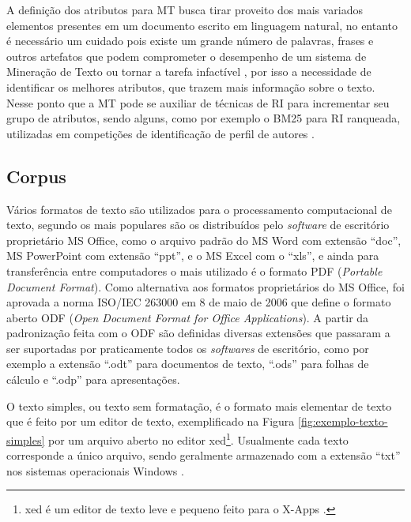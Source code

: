     A definição dos atributos para MT busca tirar proveito dos mais variados elementos presentes em um documento escrito em linguagem natural, no entanto é necessário um cuidado pois existe um grande número de palavras, frases e outros artefatos que podem comprometer o desempenho de um sistema de Mineração de Texto ou tornar a tarefa infactível \cite[p.~4]{Feldman:2006:TMH:1076381}, por isso a necessidade de identificar os melhores atributos, que trazem mais informação sobre o texto. 
    Nesse ponto que a MT pode se auxiliar de técnicas de RI para incrementar seu grupo de atributos, sendo alguns, como por exemplo o BM25 para RI ranqueada, utilizadas em competições de identificação de perfil de autores \cite{WEREN_MESTRADO_2014,WEREN_CLEF_2014,WEREN_ARTIGO_2014}. %
    
    
    
    \subsection{Corpus} \label{subsec:Corpus}
        Vários formatos de texto são utilizados para o processamento computacional de texto, segundo  os mais populares são os distribuídos pelo \textit{software} de escritório proprietário MS Office, como o arquivo padrão do MS Word com extensão ``doc'', MS PowerPoint com extensão ``ppt'', e o MS Excel com o ``xls'', e ainda para transferência entre computadores o mais utilizado é o formato PDF (\textit{Portable Document Format}).
        Como alternativa aos formatos proprietários do MS Office, foi aprovada a norma ISO/IEC 263000 em 8 de maio de 2006 que define o formato aberto ODF (\textit{Open Document Format for Office Applications}).
        A partir da padronização feita com o ODF são definidas diversas extensões que passaram a ser suportadas por praticamente todos os \textit{softwares} de escritório, como por exemplo a extensão ``.odt'' para documentos de texto, ``.ods'' para folhas de cálculo e ``.odp'' para apresentações.
        
        
        
        O texto simples, ou texto sem formatação, é o formato mais elementar de texto que é feito por um editor de texto, exemplificado na Figura \ref{fig:exemplo-texto-simples} por um arquivo aberto no editor xed\footnote{xed é um editor de texto leve e pequeno feito para o X-Apps \cite{LinuxMintXed2019}.}.
        Usualmente cada texto corresponde a único arquivo, sendo geralmente armazenado com a extensão ``txt'' nos sistemas operacionais Windows \cite[p.~6]{Jo2018TMCIBDC}.
        
